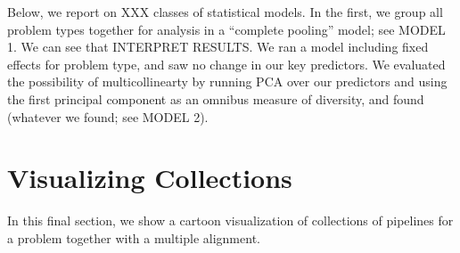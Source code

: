 \documentclass{article}
\begin{document}
Below, we report on XXX classes of statistical models. In the first, we group all problem types together for analysis in a ``complete pooling'' model; see  MODEL 1. We can see that INTERPRET RESULTS. We ran a model including fixed effects for problem type, and saw no change in our key predictors. We evaluated the possibility of multicollinearty by running PCA over our predictors and using the first principal component as an omnibus measure of diversity, and found (whatever we found; see MODEL 2).


\section{Visualizing Collections}
\label{sec:visualization}
In this final section, we show a cartoon visualization of collections
of pipelines for a problem together with a multiple alignment.
\end{document}
